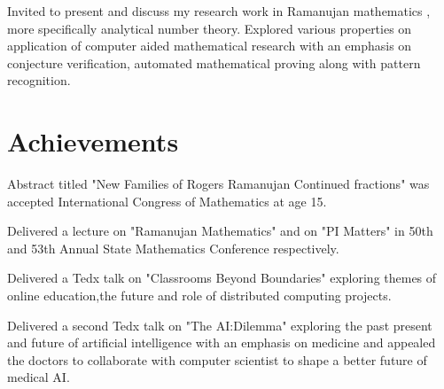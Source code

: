 \documentclass[]{deedy-resume-openfont}
\begin{document}
\begin{minipage}[t]{0.66\textwidth}
Invited to present and discuss my research work in Ramanujan mathematics , more specifically analytical number theory. Explored various properties on application of computer aided mathematical research with an emphasis on conjecture verification, automated mathematical proving along with pattern recognition.
\sectionsep




\end{minipage} 


\section{Achievements}

\vspace{\topsep} %
\begin{tightemize}\item Abstract titled "New Families of Rogers Ramanujan Continued fractions" was accepted International Congress of Mathematics at age 15.
\end{tightemize}
\sectionsep

\begin{tightemize}\item Delivered a lecture on "Ramanujan Mathematics" and on "PI Matters" in 50th and 53th Annual  State Mathematics Conference respectively.
\end{tightemize}
\sectionsep

\begin{tightemize}
\item Delivered a Tedx talk on "Classrooms Beyond Boundaries" exploring themes of online education,the future and role of distributed computing projects.

\item Delivered a second Tedx talk on "The AI:Dilemma" exploring the past present and future of artificial intelligence with an emphasis on medicine and appealed the doctors to collaborate with computer scientist to shape a better future of medical AI.


\end{tightemize}
\sectionsep
\end{document}
